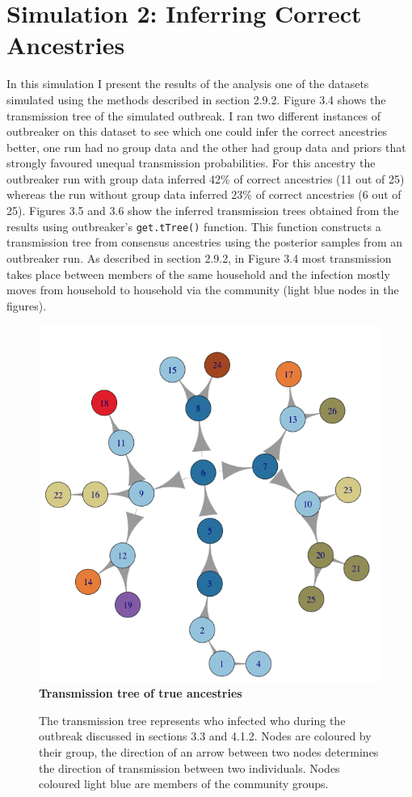 \documentclass[11pt,a4paper]{report}
\begin{document}
\section{Simulation 2: Inferring Correct Ancestries}
In this simulation I present the results of the analysis one of the datasets simulated using the methods described in section 2.9.2. Figure 3.4 shows the transmission tree of the simulated outbreak. I ran two different instances of outbreaker on this dataset to see which one could infer the correct ancestries better, one run had no group data and the other had group data and priors that strongly favoured unequal transmission probabilities. For this ancestry the outbreaker run with group data inferred 42\% of correct ancestries (11 out of 25) whereas the run without group data inferred 23\% of correct ancestries (6 out of 25). Figures 3.5 and 3.6 show the inferred transmission trees obtained from the results using outbreaker's {\tt get.tTree()} function. This function constructs a transmission tree from consensus ancestries using the posterior samples from an outbreaker run. As described in section 2.9.2, in Figure 3.4 most transmission takes place between members of the same household and the infection mostly moves from household to household via the community (light blue nodes in the figures).
\begin{figure}
\centering
\includegraphics[scale=0.5]{ancestree.png} \newline
{\bf Transmission tree of true ancestries}
\caption{The transmission tree represents who infected who during the outbreak discussed in sections 3.3 and 4.1.2. Nodes are coloured by their group, the direction of an arrow between two nodes determines the direction of transmission between two individuals. Nodes coloured light blue are members of the community groups.}
\end{figure}
\end{document}
